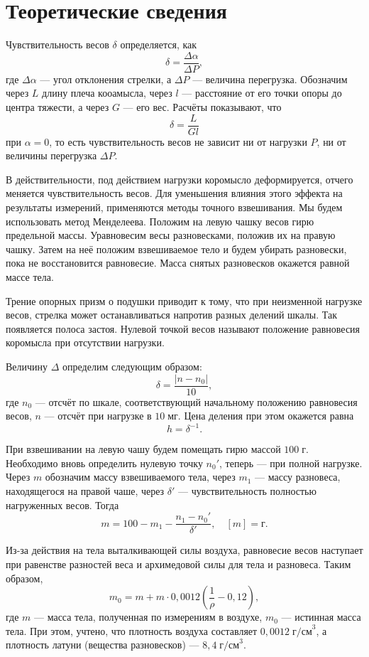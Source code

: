 \section{Теоретические сведения}

Чувствительность весов $\delta$ определяется, как
\[
\delta=\frac{\Delta\alpha}{\Delta P},
\]
где $\Delta\alpha$ --- угол отклонения стрелки, а $\Delta P$ --- величина перегрузка. Обозначим через $L$ длину плеча кооамысла, через $l$ --- расстояние от его точки опоры до центра тяжести, а через $G$ --- его вес. Расчёты показывают, что
\[
\delta=\frac{L}{Gl}
\]
при $\alpha=0$, то есть чувствительность весов не зависит ни от нагрузки $P$, ни от величины перегрузка $\Delta P$.

В действительности, под действием нагрузки коромысло деформируется, отчего меняется чувствительность весов. Для уменьшения влияния этого эффекта на результаты измерений, применяются методы точного взвешивания. Мы будем использовать метод Менделеева. Положим на левую чашку весов гирю предельной массы. Уравновесим весы разновесками, положив их на правую чашку. Затем на неё положим взвешиваемое тело и будем убирать разновески, пока не восстановится равновесие. Масса снятых разновесков окажется равной массе тела.

Трение опорных призм о подушки приводит к тому, что при неизменной нагрузке весов, стрелка может останавливаться напротив разных делений шкалы. Так появляется полоса застоя. Нулевой точкой весов называют положение равновесия коромысла при отсутствии нагрузки.

Величину $\Delta$ определим следующим образом:
\[
\delta=\frac{|n-n_0|}{10},
\]
где $n_0$ --- отсчёт по шкале, соответствующий начальному положению равновесия весов, $n$ --- отсчёт при нагрузке в $10\;\text{мг}$. Цена деления при этом окажется равна
\[
h=\delta^{-1}.
\]

При взвешивании на левую чашу будем помещать гирю массой $100\;\text{г}$. Необходимо вновь определить нулевую точку $n_0'$, теперь --- при полной нагрузке. Через $m$ обозначим массу взвешиваемого тела, через $m_1$ --- массу разновеса, находящегося на правой чаше, через $\delta'$ --- чувствительность полностью нагруженных весов. Тогда
\[
m=100-m_1-\frac{n_1-n_0'}{\delta'}, \quad [m]=\text{г}.
\]

Из-за действия на тела выталкивающей силы воздуха, равновесие весов наступает при равенстве разностей веса и архимедовой силы для тела и разновеса. Таким образом,
\[
m_0=m+m\cdot0{,}0012\left(\frac{1}{\rho}-0{,}12\right),
\]
где $m$ --- масса тела, полученная по измерениям в воздухе, $m_0$ --- истинная масса тела. При этом, учтено, что плотность воздуха составляет $0{,}0012\;\text{г/см}^3$, а плотность латуни (вещества разновесков) --- $8{,}4\;\text{г/см}^3$.